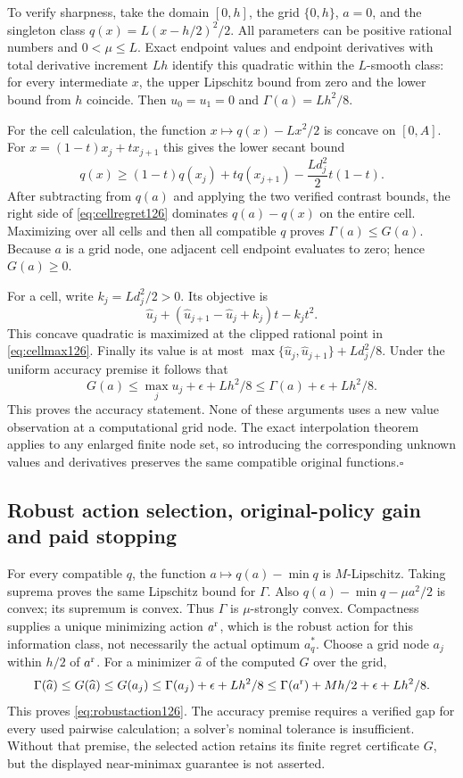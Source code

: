 To verify sharpness, take the domain $[0,h]$, the grid $\{0,h\}$,
$a=0$, and the singleton class
$q(x)=L(x-h/2)^2/2$. All parameters can be positive rational
numbers and $0<\mu\le L$. Exact endpoint values and endpoint
derivatives with total derivative increment $Lh$ identify this
quadratic within the $L$-smooth class: for every intermediate $x$,
the upper Lipschitz bound from zero and the lower bound from $h$
coincide. Then $u_0=u_1=0$ and $\Gamma(a)=Lh^2/8$.

For the cell calculation, the function
$x\mapsto q(x)-Lx^2/2$ is concave on $[0,A]$. For
$x=(1-t)x_j+t x_{j+1}$ this gives the lower secant bound
\[
 q(x)\ge (1-t)q(x_j)+tq(x_{j+1})
                     -\frac{Ld_j^2}{2}t(1-t).
\]
After subtracting from $q(a)$ and applying the two verified
contrast bounds, the right side of \eqref{eq:cellregret126}
dominates $q(a)-q(x)$ on the entire cell. Maximizing over all cells
and then all compatible $q$ proves $\Gamma(a)\le G(a)$.
Because $a$ is a grid node, one adjacent cell endpoint evaluates
to zero; hence $G(a)\ge0$.

For a cell, write $k_j=Ld_j^2/2>0$. Its objective is
\[
 \widehat u_j+
  (\widehat u_{j+1}-\widehat u_j+k_j)t-k_jt^2.
\]
This concave quadratic is maximized at the clipped rational point
in \eqref{eq:cellmax126}. Finally its value is at most
$\max\{\widehat u_j,\widehat u_{j+1}\}+Ld_j^2/8$.
Under the uniform accuracy premise it follows that
\[
 G(a)\le\max_j u_j+\epsilon+Lh^2/8
       \le\Gamma(a)+\epsilon+Lh^2/8.
\]
This proves the accuracy statement. None of these arguments uses a
new value observation at a computational grid node. The exact
interpolation theorem applies to any enlarged finite node set,
so introducing the corresponding unknown values and derivatives
preserves the same compatible original functions.\hfill$\square$

\subsection{Robust action selection, original-policy gain and paid stopping}

For every compatible $q$, the function
$a\mapsto q(a)-\min q$ is $M$-Lipschitz. Taking suprema proves
the same Lipschitz bound for $\Gamma$. Also
$q(a)-\min q-\mu a^2/2$ is convex; its supremum is convex.
Thus $\Gamma$ is $\mu$-strongly convex. Compactness supplies a
unique minimizing action $a^{\rm r}$, which is the robust action
for this information class, not necessarily the actual optimum
$a_q^*$. Choose a grid node $a_j$ within $h/2$ of $a^{\rm r}$.
For a minimizer $\widehat a$ of the computed $G$ over the grid,
\[
 \Gamma(\widehat a)\le G(\widehat a)\le G(a_j)
 \le\Gamma(a_j)+\epsilon+Lh^2/8
 \le\Gamma(a^{\rm r})+Mh/2+\epsilon+Lh^2/8.
\]
This proves \eqref{eq:robustaction126}. The accuracy premise
requires a verified gap for every used pairwise calculation; a
solver's nominal tolerance is insufficient. Without that premise,
the selected action retains its finite regret certificate $G$,
but the displayed near-minimax guarantee is not asserted.

